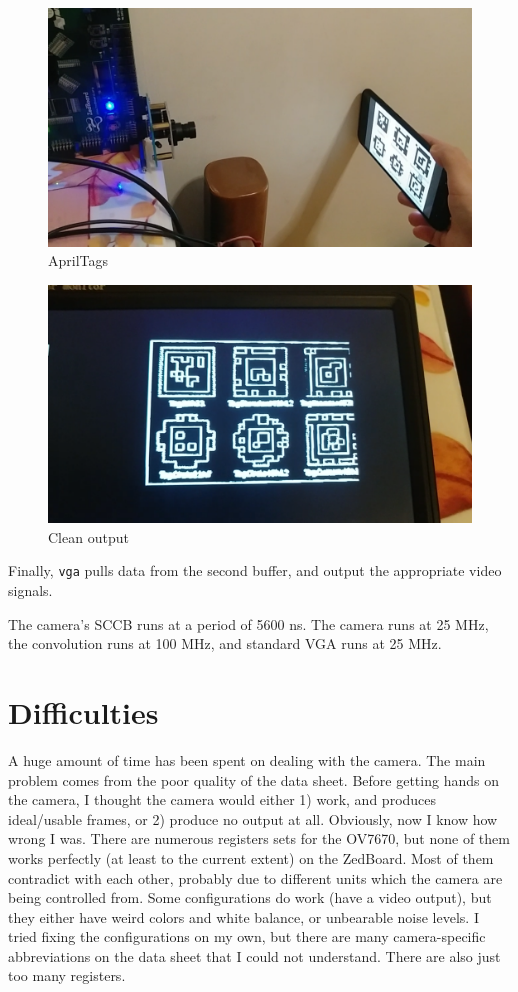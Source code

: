 \documentclass{IEEEtran}
\begin{document}
\begin{figure}[h]
		\centering
		\includegraphics[scale=0.095]{real5}
		\caption{AprilTags}
		\label{fig:real5}
	\end{figure}
\begin{figure}[h]
		\centering
		\includegraphics[scale=0.095]{real6}
		\caption{Clean output}
		\label{fig:real6}
	\end{figure}
	
	Finally, \texttt{vga} pulls data from the second buffer, and output the appropriate video signals.
	
	The camera’s SCCB runs at a period of 5600 ns. The camera runs at 25 MHz, the convolution runs at 100 MHz, and standard VGA runs at 25 MHz.
	\section{Difficulties}
	A huge amount of time has been spent on dealing with the camera. The main problem comes from the poor quality of the data sheet. Before getting hands on the camera, I thought the camera would either 1) work, and produces ideal/usable frames, or 2) produce no output at all. Obviously, now I know how wrong I was. There are numerous registers sets \cite{reg1}\cite{reg2}\cite{reg3}\cite{reg4}\cite{reg5} for the OV7670, but none of them works perfectly (at least to the current extent) on the ZedBoard. Most of them contradict with each other, probably due to different units which the camera are being controlled from. Some configurations do work (have a video output), but they either have weird colors and white balance, or unbearable noise levels. I tried fixing the configurations on my own, but there are many camera-specific abbreviations on the data sheet that I could not understand. There are also just too many registers.
	
\end{document}
